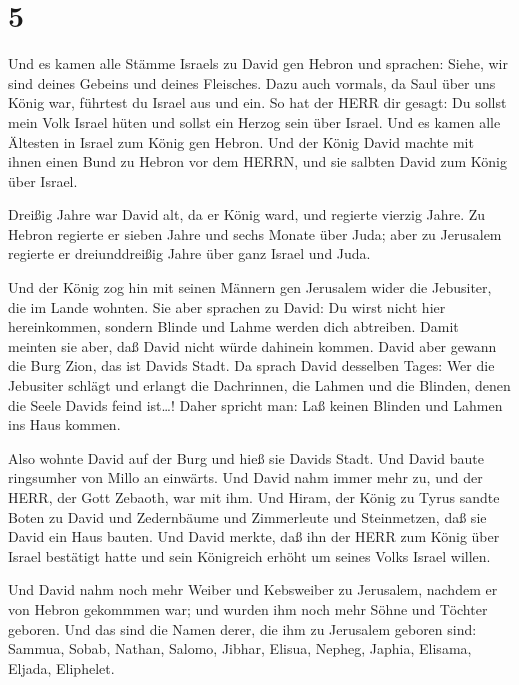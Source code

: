 \hypertarget{section-4}{%
\section{5}\label{section-4}}

 Und es kamen alle Stämme Israels zu David gen Hebron und
sprachen: Siehe, wir sind deines Gebeins und deines Fleisches.
 Dazu auch vormals, da Saul über uns König war, führtest du
Israel aus und ein. So hat der HERR dir gesagt: Du sollst mein Volk
Israel hüten und sollst ein Herzog sein über Israel.  Und es
kamen alle Ältesten in Israel zum König gen Hebron. Und der König David
machte mit ihnen einen Bund zu Hebron vor dem HERRN, und sie salbten
David zum König über Israel.

 Dreißig Jahre war David alt, da er König ward, und regierte
vierzig Jahre.  Zu Hebron regierte er sieben Jahre und sechs
Monate über Juda; aber zu Jerusalem regierte er dreiunddreißig Jahre
über ganz Israel und Juda.

 Und der König zog hin mit seinen Männern gen Jerusalem
wider die Jebusiter, die im Lande wohnten. Sie aber sprachen zu David:
Du wirst nicht hier hereinkommen, sondern Blinde und Lahme werden dich
abtreiben. Damit meinten sie aber, daß David nicht würde dahinein
kommen.  David aber gewann die Burg Zion, das ist Davids
Stadt.  Da sprach David desselben Tages: Wer die Jebusiter
schlägt und erlangt die Dachrinnen, die Lahmen und die Blinden, denen
die Seele Davids feind ist\ldots! Daher spricht man: Laß keinen Blinden
und Lahmen ins Haus kommen.

 Also wohnte David auf der Burg und hieß sie Davids Stadt.
Und David baute ringsumher von Millo an einwärts.  Und
David nahm immer mehr zu, und der HERR, der Gott Zebaoth, war mit ihm.
 Und Hiram, der König zu Tyrus sandte Boten zu David und
Zedernbäume und Zimmerleute und Steinmetzen, daß sie David ein Haus
bauten.  Und David merkte, daß ihn der HERR zum König über
Israel bestätigt hatte und sein Königreich erhöht um seines Volks Israel
willen.

 Und David nahm noch mehr Weiber und Kebsweiber zu
Jerusalem, nachdem er von Hebron gekommmen war; und wurden ihm noch mehr
Söhne und Töchter geboren.  Und das sind die Namen derer,
die ihm zu Jerusalem geboren sind: Sammua, Sobab, Nathan, Salomo,
 Jibhar, Elisua, Nepheg, Japhia,  Elisama,
Eljada, Eliphelet.

